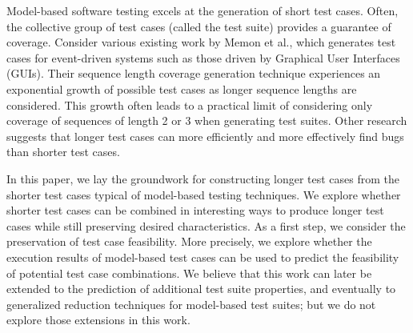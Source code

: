 Model-based software testing excels at the generation of short test cases. Often,
the collective group of test cases (called the test suite) provides a guarantee
of coverage. Consider various existing work by Memon et al., which generates test
cases for event-driven systems such as those driven by Graphical User Interfaces
(GUIs). Their sequence length coverage generation technique experiences an
exponential growth of possible test cases as longer sequence lengths are considered. This
growth often leads to a practical limit of considering only coverage of sequences 
of length 2 or 3 when generating test suites. Other research suggests that longer
test cases can more efficiently and more effectively find bugs than shorter test
cases.

In this paper, we lay the groundwork for constructing longer test cases from the shorter
test cases typical of model-based testing techniques. We explore whether shorter test cases
can be combined in interesting ways to produce longer test cases while still preserving
desired characteristics. As a first step, we consider the preservation of test case
feasibility. More precisely, we explore whether the execution results of model-based test
cases can be used to predict the feasibility of potential test case combinations. We believe
that this work can later be extended to the prediction of additional test suite properties,
and eventually to generalized reduction techniques for model-based test suites; but
we do not explore those extensions in this work.

